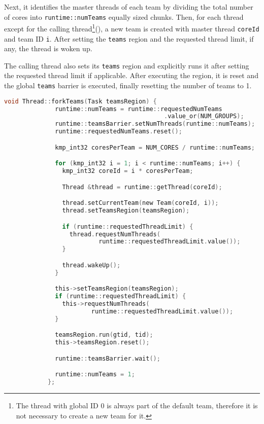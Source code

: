 \begin{itemize}
	      Next, it identifies the master threads of each team by dividing the total number of cores
	      into \texttt{runtime::numTeams} equally sized chunks. Then, for each thread except for the
	      calling thread\footnote{The thread with global ID 0 is always part of the default team,
		      therefore it is not necessary to create a new team for it.}(), a new
	      team is created with master thread \texttt{coreId} and team ID \texttt{i}. After setting
	      the \texttt{teams} region and the requested thread limit, if any, the thread is woken up.

	      The calling thread also sets its \texttt{teams} region and explicitly runs it after
	      setting the requested thread limit if applicable. After executing the region, it is reset
	      and the global \texttt{teams} barrier is executed, finally resetting the number of teams
	      to 1.

	      \begin{lstlisting}[language=C, caption={void Thread::forkTeams},
          label={lst:thread-forkTeams},
          escapechar=@]
            void Thread::forkTeams(Task teamsRegion) {
              runtime::numTeams = runtime::requestedNumTeams
                                            .value_or(NUM_GROUPS);
              runtime::teamsBarrier.setNumThreads(runtime::numTeams);
              runtime::requestedNumTeams.reset();

              kmp_int32 coresPerTeam = NUM_CORES / runtime::numTeams;

              for (kmp_int32 i = 1; i < runtime::numTeams; i++) {
                kmp_int32 coreId = i * coresPerTeam;

                Thread &thread = runtime::getThread(coreId);

                thread.setCurrentTeam(new Team(coreId, i));
                thread.setTeamsRegion(teamsRegion);

                if (runtime::requestedThreadLimit) {
                  thread.requestNumThreads(
                          runtime::requestedThreadLimit.value());
                }

                thread.wakeUp();
              }

              this->setTeamsRegion(teamsRegion);
              if (runtime::requestedThreadLimit) {
                this->requestNumThreads(
                        runtime::requestedThreadLimit.value());
              }

              teamsRegion.run(gtid, tid);
              this->teamsRegion.reset();

              runtime::teamsBarrier.wait();

              runtime::numTeams = 1;
            };
    \end{lstlisting}

\end{itemize}

